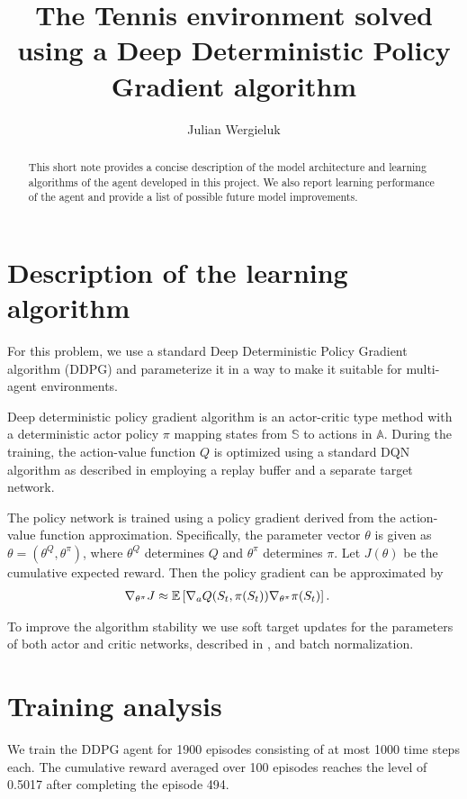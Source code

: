 \documentclass[a4paper,12pt]{amsart}
\title[Multi-Agent Deep Deterministic Policy Gradients]{The Tennis environment solved using a Deep Deterministic Policy Gradient algorithm}
\author{Julian Wergieluk}\address{}\email{julian.wergieluk@risklab.com}
\newcommand{\stateSpace}{\mathbb S}
\newcommand{\actionSpace}{\mathbb A}
\begin{document}
\maketitle

\begin{abstract}
This short note provides a concise description of the model architecture and
learning algorithms of the agent developed in this project. We also report learning
performance of the agent and provide a list of possible future model improvements.
\end{abstract}

\section{Description of the learning algorithm}

For this problem, we use a standard Deep Deterministic Policy Gradient 
algorithm (DDPG) and parameterize it in a way to make it suitable for multi-agent
environments.

Deep deterministic policy gradient algorithm is an actor-critic type method
with a deterministic actor policy $\pi$ mapping states from $\stateSpace$ to
actions in $\actionSpace$. During the training, the action-value
function $Q$ is optimized using a standard DQN algorithm as described in
\cite{mnih2015humanlevel} employing a replay buffer and a separate target
network.

The policy network is trained using a policy gradient derived from the action-value
function approximation. Specifically, the parameter vector $\theta$ is given as
$\theta = (\theta^{Q}, \theta^{\pi})$, where $\theta^{Q}$ determines $Q$ and
$\theta^{\pi}$ determines $\pi$. Let $J(\theta)$ be the cumulative expected 
reward. Then the policy gradient can be approximated by
\begin{align*}
    \nabla_{\theta^{\pi}} J & \approx
    \mathbb{E} \left[ \nabla_{a} Q(S_t, \pi(S_t)) \nabla_{\theta^\pi} \pi(S_t) \right].
\end{align*}

To improve the algorithm stability we use soft target updates for the
parameters of both actor and critic networks, described in
\cite{mnih2015humanlevel}, and batch normalization.

\section{Training analysis}

We train the DDPG agent for 1900 episodes consisting of at most 1000 time steps
each. The cumulative reward averaged over 100 episodes reaches the level of
0.5017 after completing the episode 494. 
\end{document}
